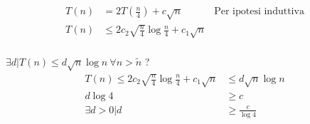 \begin{enumerate}[label=\alph*)]
	\begin{align*}
		T(n) &= 2T \left( \frac{n}{4} \right) + c\sqrt{n}  & \text{Per ipotesi induttiva} \\
		T(n) &\leq 2c_2\sqrt{\frac{n}{4}} \log \frac{n}{4} + c_1\sqrt{n} \\
	\end{align*}
	
	\( \exists d | T(n) \leq d \sqrt{n} \log n \ \forall n > \tilde{n} \) ? \\
	
	\begin{align*}
		T(n) \leq 2c_2\sqrt{\frac{n}{4}} \log \frac{n}{4} + c_1\sqrt{n} &\leq d \sqrt{n} \log n \\
		d \log 4 &\geq c \\
		\exists d > 0 | d &\geq \frac{c}{\log 4} \\
	\end{align*}

\end{enumerate}
